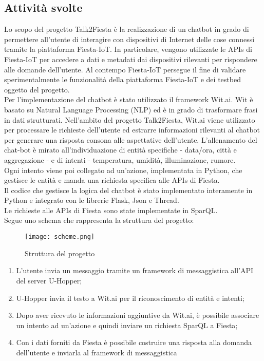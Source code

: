 \documentclass[a4paper,11pt]{article}
\theoremstyle{plain}
\begin{document}
\subsection*{Attività svolte}
Lo scopo del progetto Talk2Fiesta è la realizzazione di un chatbot in grado di permettere all'utente di interagire con dispositivi di Internet delle cose connessi tramite la piattaforma Fiesta-IoT. In particolare, vengono utilizzate le APIs di Fiesta-IoT per accedere a dati e metadati dai dispositivi rilevanti per rispondere alle domande dell'utente. Al contempo Fiesta-IoT persegue il fine di validare sperimentalmente le funzionalit\`a della piattaforma Fiesta-IoT e dei testbed oggetto del progetto. \\
Per l'implementazione del chatbot è stato utilizzato il framework Wit.ai. Wit è basato su Natural Language Processing (NLP) ed è in grado di trasformare frasi in dati strutturati. Nell'ambito del progetto Talk2Fiesta, Wit.ai viene utilizzato per processare le richieste dell'utente ed estrarre informazioni rilevanti al chatbot per generare una risposta consona alle aspettative dell'utente.  L'allenamento del chat-bot è mirato all'individuazione di entità specifiche - data/ora, città e aggregazione - e di intenti - temperatura, umidità, illuminazione, rumore. \\
Ogni intento viene poi collegato ad un'azione, implementata in Python, che gestisce le entità e manda una richiesta specifica alle APIs di Fiesta. \\
Il codice che gestisce la logica del chatbot è stato implementato interamente in Python e integrato con le librerie Flask, Json e Thread.\\
Le richieste alle APIs di Fiesta sono state implementate in SparQL.\\
Segue uno schema che rappresenta la struttura del progetto:
\vspace{0.2cm}
\begin{figure}[!h]
\centering
\texttt{[image: scheme.png]}
\caption{Struttura del progetto}
\end{figure}
\vspace{1cm}
\begin{enumerate}
\item L'utente invia un messaggio tramite un framework di messaggistica all'API del server U-Hopper;
\item U-Hopper invia il testo a Wit.ai per il riconoscimento di entità e intenti;
\item Dopo aver ricevuto le informazioni aggiuntive da Wit.ai, è possibile associare un intento ad un'azione e quindi inviare un richiesta SparQL a Fiesta;
\item Con i dati forniti da Fiesta è possibile costruire una risposta alla domanda dell'utente e inviarla al framework di messaggistica
\end{enumerate}
\end{document}
